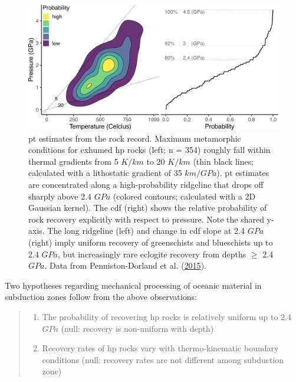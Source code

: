 \begin{figure}[htbp]

{\centering \includegraphics[width=1\linewidth,]{assets/figs/chpt4/pd15} 

}

\caption[\gls{pt} estimates from the rock record]{\gls{pt} estimates from the rock record. Maximum metamorphic conditions for exhumed \gls{hp} rocks (left; n = 354) roughly fall within thermal gradients from 5 \(K/km\) to 20 \(K/km\) (thin black lines; calculated with a lithostatic gradient of 35 \(km/GPa\)). \gls{pt} estimates are concentrated along a high-probability ridgeline that drops off sharply above 2.4 \(GPa\) (colored contours; calculated with a 2D Gaussian kernel). The \gls{cdf} (right) shows the relative probability of rock recovery explicitly with respect to pressure. Note the shared y-axis. The long ridgeline (left) and change in \gls{cdf} slope at 2.4 \(GPa\) (right) imply uniform recovery of greenschists and blueschists up to 2.4 \(GPa\), but increasingly rare eclogite recovery from depths \(\geq\) 2.4 \(GPa\). Data from Penniston-Dorland et al. (\protect\hyperlink{ref-penniston2015}{2015}).}\label{fig:pd15}
\end{figure}

Two hypotheses regarding mechanical processing of oceanic material in subduction zones follow from the above observations:

\begin{quote}
\begin{enumerate}
\def\labelenumi{\arabic{enumi}.}
\item
  The probability of recovering \gls{hp} rocks is relatively uniform up to 2.4 \(GPa\) (null: recovery is non-uniform with depth)
\item
  Recovery rates of \gls{hp} rocks vary with thermo-kinematic boundary conditions (null: recovery rates are not different among subduction zone)
\end{enumerate}
\end{quote}

